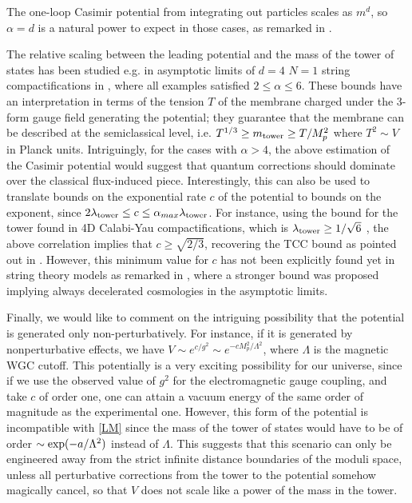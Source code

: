 \documentclass[11pt]{article}
\numberwithin{equation}{section}
\numberwithin{equation}{section}
\theoremstyle{remark}
\begin{document}
The one-loop Casimir potential from integrating out particles scales as $m^d$, so $\alpha=d$ is a natural power to expect in those cases, as remarked in \cite{Rudelius:2021oaz,Gonzalo:2021fma}.  

The relative scaling between the leading potential and the mass of the tower of states has been studied e.g. in asymptotic limits of $d=4$ $N=1$ string compactifications in \cite{Lanza:2020qmt,Lanza:2021udy}, where all examples satisfied $2\leq\alpha\leq 6$.  
 These bounds have an interpretation in terms of the tension $T$ of the membrane charged under the 3-form gauge field generating the potential; they guarantee that the membrane can be described at the semiclassical level, i.e. $T^{1/3}\geq m_{\rm tower}\geq T/M_p^2$ where $T^2\sim V$ in Planck units. Intriguingly, for the cases with $\alpha> 4$, the above estimation of the Casimir potential would suggest that quantum corrections should dominate over the classical flux-induced piece. Interestingly, this can also be used to translate bounds on the exponential rate $c$ of the potential to bounds on the exponent, since $2\lambda_{\rm tower}\leq c\leq \alpha_{max}\lambda_{\rm tower}$. For instance, using the bound for the tower found in 4D Calabi-Yau compactifications, which is $\lambda_{\rm tower}\geq 1/\sqrt{6}$ \cite{Gendler:2020dfp}, the above correlation implies that $c\geq \sqrt{2/3}$, recovering the TCC bound \cite{Bedroya:2019snp} as pointed out in \cite{Andriot:2020lea}. However, this minimum value for $c$ has not been explicitly found yet in string theory models as remarked in \cite{Rudelius:2021azq}, where a stronger bound was proposed implying always decelerated cosmologies in the asymptotic limits.

Finally, we would like to comment on the intriguing possibility that the potential is generated only non-perturbatively. For instance, if it is generated by nonperturbative effects, we have $V\sim e^{c/g^2}\sim e^{-cM_p^2/\Lambda^2}$, where $\Lambda$ is the magnetic WGC cutoff. This potentially is a very exciting possibility for our universe, since if we use the observed value of $g^2$ for the electromagnetic gauge coupling, and take $c$ of order one, one can attain a vacuum energy of the same order of magnitude as the experimental one. However, this form of the potential  is incompatible with \eqref{LM} since the mass of the tower of states  would have to be of order $\sim {\rm exp}(-a/\Lambda^2)$ instead of $\Lambda$. This suggests that this scenario can only be engineered away from the strict infinite distance boundaries of the moduli space, unless  all perturbative corrections from the tower to the potential somehow magically cancel, so that $V$ does not scale like a power of the mass in the tower.
\end{document}
